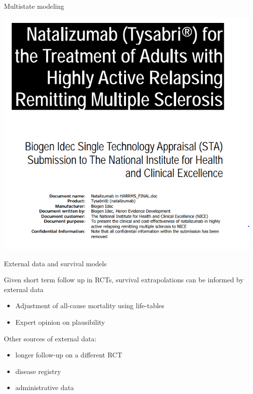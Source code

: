 \documentclass[ignorenonframetext,]{beamer}
\providecommand{\tightlist}{%
  \setlength{\itemsep}{0pt}\setlength{\parskip}{0pt}}
\begin{document}
\begin{frame}{Multistate modeling}

\includegraphics[width=0.8\linewidth]{figures/msmnice}

\end{frame}

\begin{frame}{External data and survival models}

Given short term follow up in RCTs, survival extrapolations can be
informed by external data

\begin{itemize}
\tightlist
\item
  Adjustment of all-cause mortality using life-tables
\item
  Expert opinion on plausibility
\end{itemize}

Other sources of external data:

\begin{itemize}
\tightlist
\item
  longer follow-up on a different RCT
\item
  disease registry
\item
  administrative data
\end{itemize}

\end{frame}
\end{document}
